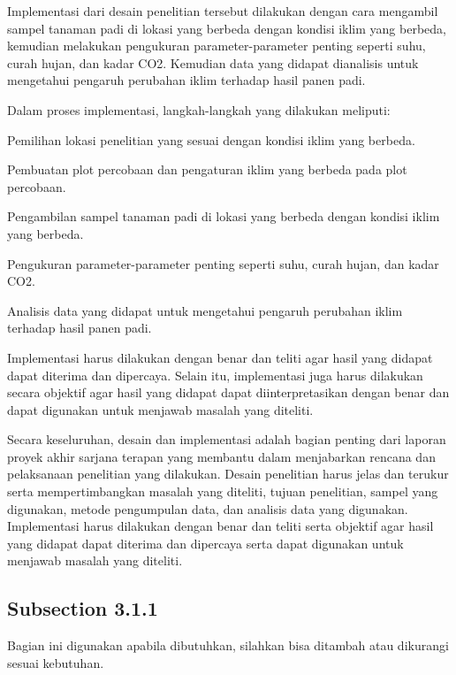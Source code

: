 Implementasi dari desain penelitian tersebut dilakukan dengan cara mengambil sampel tanaman padi di lokasi yang berbeda dengan kondisi iklim yang berbeda, kemudian melakukan pengukuran parameter-parameter penting seperti suhu, curah hujan, dan kadar CO2. Kemudian data yang didapat dianalisis untuk mengetahui pengaruh perubahan iklim terhadap hasil panen padi.

Dalam proses implementasi, langkah-langkah yang dilakukan meliputi:

\begin{packed_enum}
    \item Pemilihan lokasi penelitian yang sesuai dengan kondisi iklim yang berbeda.
    \item Pembuatan plot percobaan dan pengaturan iklim yang berbeda pada plot percobaan.
    \item Pengambilan sampel tanaman padi di lokasi yang berbeda dengan kondisi iklim yang berbeda.
    \item Pengukuran parameter-parameter penting seperti suhu, curah hujan, dan kadar CO2.
    \item Analisis data yang didapat untuk mengetahui pengaruh perubahan iklim terhadap hasil panen padi.
    \item Implementasi harus dilakukan dengan benar dan teliti agar hasil yang didapat dapat diterima dan dipercaya. Selain itu, implementasi juga harus dilakukan secara objektif agar hasil yang didapat dapat diinterpretasikan dengan benar dan dapat digunakan untuk menjawab masalah yang diteliti.
\end{packed_enum}

Secara keseluruhan, desain dan implementasi adalah bagian penting dari laporan proyek akhir sarjana terapan yang membantu dalam menjabarkan rencana dan pelaksanaan penelitian yang dilakukan. Desain penelitian harus jelas dan terukur serta mempertimbangkan masalah yang diteliti, tujuan penelitian, sampel yang digunakan, metode pengumpulan data, dan analisis data yang digunakan. Implementasi harus dilakukan dengan benar dan teliti serta objektif agar hasil yang didapat dapat diterima dan dipercaya serta dapat digunakan untuk menjawab masalah yang diteliti.

\subsection{Subsection 3.1.1}
Bagian ini digunakan apabila dibutuhkan, silahkan bisa ditambah atau dikurangi sesuai kebutuhan.

